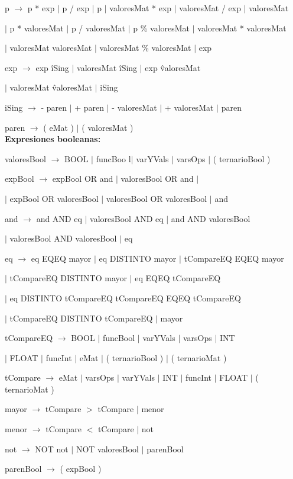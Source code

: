  p $\rightarrow$ p * exp $|$ p / exp $|$ p  $|$ valoresMat * exp $|$ valoresMat / exp $|$ valoresMat 
 
   \hspace{15mm} $|$ p * valoresMat $|$ p / valoresMat $|$ p \% valoresMat $|$ valoresMat * valoresMat
   
   \hspace{15mm} $|$ valoresMat \/ valoresMat $|$ valoresMat \% valoresMat $|$ exp
    
 exp $\rightarrow$ exp \^ iSing $|$ valoresMat \^ iSing $|$ exp \^ valoresMat
 
 \hspace{15mm} $|$ valoresMat \^ valoresMat $|$ iSing
  
iSing $\rightarrow$ - paren $|$ + paren $|$ - valoresMat $|$ + valoresMat $|$ paren
  
  
 paren $\rightarrow$ ( eMat )  $|$ ( valoresMat ) \\
  
  
\textbf{Expresiones booleanas:} 

valoresBool $\rightarrow$ BOOL $|$ funcBoo l$|$ varYVals $|$ varsOps $|$ (  ternarioBool )  
 
 expBool $\rightarrow$ expBool OR and $|$ valoresBool OR and $|$
 
 \hspace{15mm}$|$ expBool OR valoresBool $|$ valoresBool OR valoresBool $|$ and
  
 and $\rightarrow$ and AND eq $|$ valoresBool AND eq $|$ and AND valoresBool 
 
 \hspace{15mm}$|$ valoresBool AND valoresBool $|$ eq

 eq $\rightarrow$ eq EQEQ mayor $|$ eq DISTINTO mayor $|$ tCompareEQ EQEQ mayor 
 
 \hspace{15mm} $|$ tCompareEQ DISTINTO mayor $|$ eq EQEQ tCompareEQ  
 
 \hspace{15mm} $|$ eq DISTINTO tCompareEQ  tCompareEQ EQEQ tCompareEQ 
 
 \hspace{15mm} $|$ tCompareEQ DISTINTO tCompareEQ $|$ mayor
  
 
 tCompareEQ $\rightarrow$ BOOL $|$ funcBool $|$ varYVals $|$ varsOps $|$ INT
  
 \hspace{15mm} $|$ FLOAT $|$ funcInt $|$ eMat $|$ ( ternarioBool )  $|$ ( ternarioMat )
  
  
  tCompare $\rightarrow$ eMat $|$ varsOps $|$ varYVals $|$ INT $|$ funcInt  $|$ FLOAT $|$ ( ternarioMat ) 
  
  mayor  $\rightarrow$ tCompare $>$ tCompare $|$ menor
  
  menor  $\rightarrow$ tCompare $<$ tCompare $|$ not
  
   not  $\rightarrow$  NOT not $|$ NOT valoresBool $|$ parenBool
  
  parenBool  $\rightarrow$ ( expBool ) 
  
  
